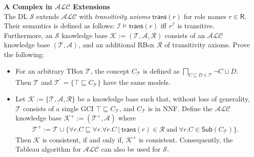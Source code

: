 \documentclass[12pt,a4paper]{article}
\newcommand{\alc}{$\mathcal{ALC}$\xspace}
\newenvironment{problems}[2][{\color{purple}Question}]{\begin{trivlist}
\item[\hskip \labelsep {\bfseries #1}\hskip \labelsep {\bfseries #2.}]}{\end{trivlist}}
\begin{document}
\begin{problems}{{\color{purple}11 (with 1 bonus mark)}}
\textbf{A Complex in \alc Extensions}\\
The DL $\mathcal{S}$ extends \alc with \emph{transitivity axioms} $\textsf{trans}(r)$ for role names $r\in\textsf{R}$. Their semantics is defined as follows: $\mathcal{I}\models\textsf{trans}(r)$ iff $r^{\mathcal{I}}$ is transitive. Furthermore, an $\mathcal{S}$ knowledge base $\mathcal{K}:=(\mathcal{T}, \mathcal{A}, \mathcal{R})$ consists of an \alc knowledge base $(\mathcal{T}, \mathcal{A})$, and an additional RBox $\mathcal{R}$ of transitivity axioms. Prove the following:
\begin{itemize}
\item[-] For an arbitrary TBox $\mathcal{T}$, the concept $C_{\mathcal{T}}$ is defined as $\underset{C\sqsubseteq D\in\mathcal{T}}{\bigsqcap}\neg C\sqcup D$. Then $\mathcal{T}$ and $\mathcal{T}^{\prime}=\{\top\sqsubseteq C_{\mathcal{T}}\}$ have the same models.
\item[-] Let $\mathcal{K}:=\{\mathcal{T}, \mathcal{A}, \mathcal{R}\}$ be a knowledge base such that, without loss of generality, $\mathcal{T}$ consists of a single GCI $\top\sqsubseteq C_{\mathcal{T}}$, and $C_{\mathcal{T}}$ is in NNF. Define the \alc knowledge base $\mathcal{K}^{+}:=(\mathcal{T}^{+}, \mathcal{A})$ where
\begin{align*}
    &\mathcal{T}^{+}:=\mathcal{T}\cup\{\forall r.C\sqsubseteq\forall r.\forall r.C~|~\textsf{trans}(r)\in\mathcal{R}~\text{and}~\forall r.C\in\textsf{Sub}(C_{\mathcal{T}})\}.
\end{align*}
Then $\mathcal{K}$ is consistent, if and only if, $\mathcal{K}^{+}$ is consistent. Consequently, the Tableau algorithm for \alc can also be used for $\mathcal{S}$.
\end{itemize}
\end{problems}
\end{document}
